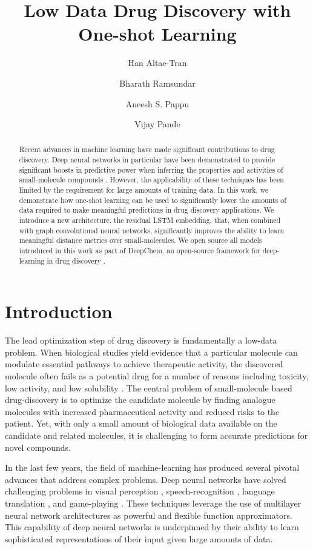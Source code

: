 \documentclass[journal=jacsat,manuscript=article]{achemso}
\author{Han Altae-Tran}
\affiliation{Department of Biological Engineering, Massachusetts Institute of Technology}
\author{Bharath Ramsundar}
\affiliation{Department of Computer Science, Stanford University}
\author{Aneesh S. Pappu}
\affiliation{Department of Computer Science, Stanford University}
\author{Vijay Pande}
\affiliation{Department of Chemistry, Stanford University}
\title{Low Data Drug Discovery with One-shot Learning}
\begin{document}
\maketitle

\begin{abstract}
Recent advances in machine learning have made significant contributions to drug discovery. Deep neural networks in particular have been demonstrated to provide significant boosts in predictive power when inferring the properties and activities of small-molecule compounds \cite{ma2015deep}. However, the applicability of these techniques has been limited by the requirement for large amounts of training data. In this work, we demonstrate how one-shot learning can be used to significantly lower the amounts of data required to make meaningful predictions in drug discovery applications. We introduce a new architecture, the residual LSTM embedding, that, when combined with graph convolutional neural networks, significantly improves the ability to learn meaningful distance metrics over small-molecules. We open source all models introduced in this work as part of DeepChem, an open-source framework for deep-learning in drug discovery \cite{ram2016}.
\end{abstract}

\section{Introduction}
The lead optimization step of drug discovery is fundamentally a low-data problem. When biological studies yield evidence that a particular molecule can modulate essential pathways to achieve therapeutic activity, the discovered molecule often fails as a potential drug for a number of reasons including toxicity, low activity, and low solubility \cite{waring2015analysis}. The central problem of small-molecule based drug-discovery is to optimize the candidate molecule by finding analogue molecules with increased pharmaceutical activity and reduced risks to the patient. Yet, with only a small amount of biological data available on the candidate and related molecules, it is challenging to form accurate predictions for novel compounds.

In the last few years, the field of machine-learning has produced several pivotal advances that address complex problems. Deep neural networks have solved challenging problems in visual perception \cite{ILSVRC15}, speech-recognition \cite{deng2013new}, language translation \cite{wu2016google}, and game-playing \cite{silver2016mastering}. These techniques leverage the use of multilayer neural network architectures as powerful and flexible function approximators. This capability of deep neural networks is underpinned by their ability to learn sophisticated representations of their input given large amounts of data.
\end{document}
